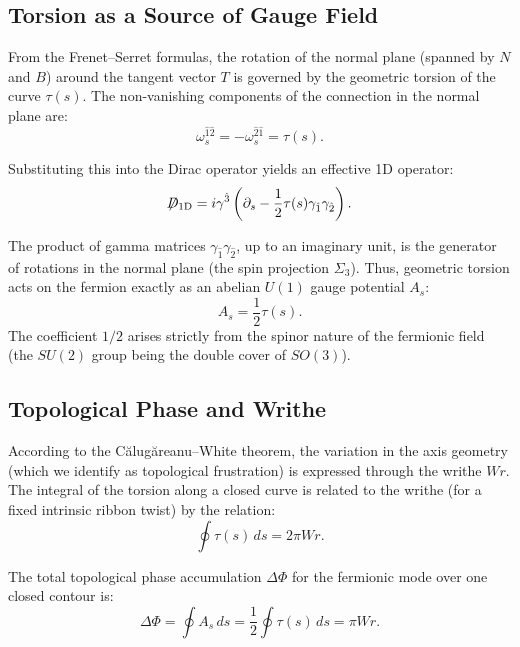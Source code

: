 \documentclass[12pt, a4paper]{article}
\theoremstyle{definition}
\newcommand{\notD}{\not\!\!D}
\begin{document}
\subsection{Torsion as a Source of Gauge Field}
From the Frenet--Serret formulas, the rotation of the normal plane (spanned by $N$ and $B$) around the tangent vector $T$ is governed by the geometric torsion of the curve $\tau(s)$. The non-vanishing components of the connection in the normal plane are:
\begin{equation}
\omega_s^{\hat{1}\hat{2}} = -\omega_s^{\hat{2}\hat{1}} = \tau(s).
\end{equation}

Substituting this into the Dirac operator yields an effective 1D operator:
\begin{equation}
\notD_{\rm 1D} = i \gamma^{\hat{3}} \left( \partial_s - \frac{1}{2} \tau(s) \gamma_{\hat{1}} \gamma_{\hat{2}} \right).
\end{equation}

The product of gamma matrices $\gamma_{\hat{1}} \gamma_{\hat{2}}$, up to an imaginary unit, is the generator of rotations in the normal plane (the spin projection $\Sigma_3$). Thus, geometric torsion acts on the fermion exactly as an abelian $U(1)$ gauge potential $A_s$:
\begin{equation}
A_s = \frac{1}{2} \tau(s).
\end{equation}
The coefficient $1/2$ arises strictly from the spinor nature of the fermionic field (the $SU(2)$ group being the double cover of $SO(3)$).

\subsection{Topological Phase and Writhe}
According to the C\u{a}lug\u{a}reanu--White theorem, the variation in the axis geometry (which we identify as topological frustration) is expressed through the writhe $Wr$. The integral of the torsion along a closed curve is related to the writhe (for a fixed intrinsic ribbon twist) by the relation:
\begin{equation}
\oint \tau(s) \, ds = 2\pi Wr.
\end{equation}

The total topological phase accumulation $\Delta \Phi$ for the fermionic mode over one closed contour is:
\begin{equation}
\Delta \Phi = \oint A_s \, ds = \frac{1}{2} \oint \tau(s) \, ds = \pi Wr.
\end{equation}
\end{document}
